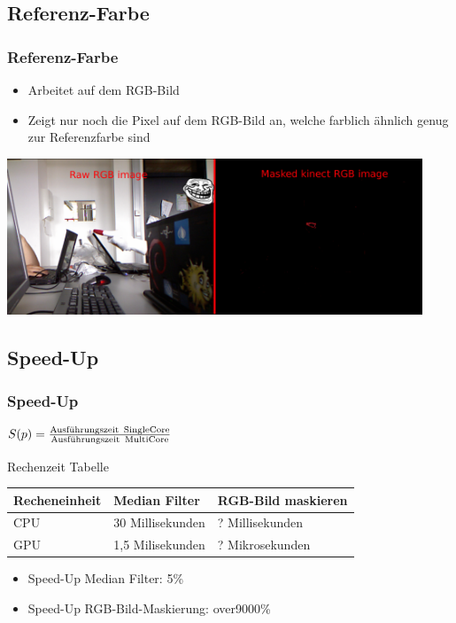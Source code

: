 \documentclass{beamer}
\begin{document}
\subsection{Referenz-Farbe}
\begin{frame}
\frametitle{Referenz-Farbe}
\begin{itemize}
	\item Arbeitet auf dem RGB-Bild
	\item Zeigt nur noch die Pixel auf dem RGB-Bild an, welche farblich ähnlich genug zur Referenzfarbe sind
\end{itemize}

\includegraphics[width=12.4cm]{filter4.png}
\end{frame}

\subsection{Speed-Up}
\begin{frame}
\frametitle{Speed-Up}

{\Large $S(p)=\frac{\text{Ausführungszeit\, SingleCore}}{\text{Ausführungszeit\, MultiCore}}$}
\vspace*{0.4cm}
\begin{block}{Rechenzeit Tabelle}
	\begin{table}
		\begin{tabular}{|l|l|l|}
		\hline
		\textbf{Recheneinheit} & \textbf{Median Filter} & \textbf{RGB-Bild maskieren}\\
		\hline
		CPU & 30 Millisekunden & ? Millisekunden \\ \hline
		GPU & 1,5 Milisekunden & ? Mikrosekunden \\ \hline
		\end{tabular}
	\end{table}
\end{block}
\vspace*{0.4cm}
{\large
\begin{itemize}
	\item[] Speed-Up Median Filter: 5\%
	\item[] Speed-Up RGB-Bild-Maskierung: over9000\%
\end{itemize}
}

\end{frame}
\end{document}

